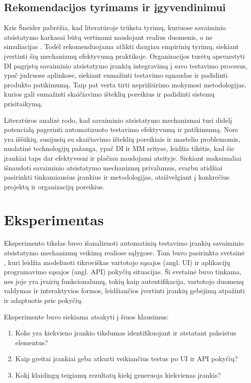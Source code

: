 \documentclass[
]{VUMIFPSkursinis}
\begin{document}
\subsection{Rekomendacijos tyrimams ir įgyvendinimui}

Kris Šneider pabrėžia, kad literatūroje trūksta tyrimų, kuriuose savaiminio atsistatymo karkasai būtų vertinami naudojant realius duomenis, o ne simuliacijas \cite[22]{Schneider2013}. Todėl rekomenduojama atlikti daugiau empirinių tyrimų, siekiant įvertinti šių mechanizmų efektyvumą praktikoje. Organizacijos turėtų apsvarstyti DI pagrįstų savaiminio atsistatymo įrankių integravimą į savo testavimo procesus, ypač judruose aplinkose, siekiant sumažinti testavimo sąnaudas ir padidinti produkto patikimumą. Taip pat verta tirti neprižiūrimo mokymosi metodologijas, kurios gali sumažinti skaičiavimo išteklių poreikius ir padidinti sistemų prisitaikymą.

Literatūros analizė rodo, kad savaiminio atsistatymo mechanizmai turi didelį potencialą pagerinti automatizuoto testavimo efektyvumą ir patikimumą. Nors yra iššūkių, susijusių su skaičiavimo išteklių poreikiais ir mastelio problemomis, nuolatinė technologijų pažanga, ypač DI ir MM srityse, leidžia tikėtis, kad šie įrankiai taps dar efektyvesni ir plačiau naudojami ateityje. Siekiant maksimaliai išnaudoti savaiminio atsistatymo mechanizmų privalumus, svarbu atidžiai pasirinkti tinkamiausius įrankius ir metodologijas, atsižvelgiant į konkrečius projektų ir organizacijų poreikius.

\section{Eksperimentas}

Eksperimento tikslas buvo išanalizuoti automatinių testavimo įrankių savaiminio atsistatymo mechanizmų veikimą realiose sąlygose. Tam buvo pasirinkta svetainė \cite{Demo}, kuri leidžia modeliuoti tikroviškas vartotojo sąsajos (angl. UI) ir aplikacijų programavimo sąsajos (angl. API) pokyčių situacijas. Ši svetainė buvo tinkama, nes joje yra įvairių funkcionalumų, tokių kaip autentifikacija, vartotojo duomenų valdymas ir interaktyvios formos, leidžiančios įvertinti įrankių gebėjimą atpažinti ir adaptuotis prie pokyčių.

Eksperimente buvo siekiama atsakyti į šiuos klausimus:

\begin{enumerate}
    \item Koks yra kiekvieno įrankio tikslumas identifikuojant ir atstatant pakeistus elementus?
    \item Kaip greitai įrankiai geba atkurti veikiančius testus po UI ir API pokyčių?
    \item Kokį klaidingų teigiamų rezultatų kiekį generuoja kiekvienas įrankis?
\end{enumerate}
\end{document}
